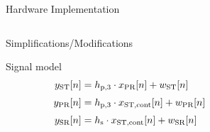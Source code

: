 \documentclass[16pt]{beamer}
\newcommand{\fs}[2]{\fontsize{#1 pt}{#2}\selectfont}
\begin{document}
\begin{frame}[t]{Hardware Implementation}
\begin{columns}
\begin{column}{0.45\columnwidth}
{\begin{block}{\footnotesize Simplifications/Modifications}
\begin{itemize}
				\end{itemize}				
			\end{block}
			\vspace{3mm}
			\begin{block}{\footnotesize Signal model}
				\vspace{-3mm}
				\begin{align*}
					y_{\text{ST}}[n] &= h_{\text{p,3}} \cdot x_{\text{PR}}[n] + w_{\text{ST}}[n] \\[0.3em]
					y_{\text{PR}}[n] &= h_{\text{p,3}} \cdot x_{\text{ST,cont}}[n] + w_{\text{PR}}[n] \\[0.3em]
					y_{\text{SR}}[n] &= h_{\text{s}} \cdot x_{\text{ST,cont}}[n] + w_{\text{SR}}[n]
				\end{align*}
			\end{block} 
			}

		\end{column}
		\begin{column}{0.55\columnwidth}
		\fs{7}{8}
			\begin{overlayarea}{\textwidth}{3.8cm}

\end{overlayarea}
\end{column}
\end{columns}
\end{frame}
\end{document}

